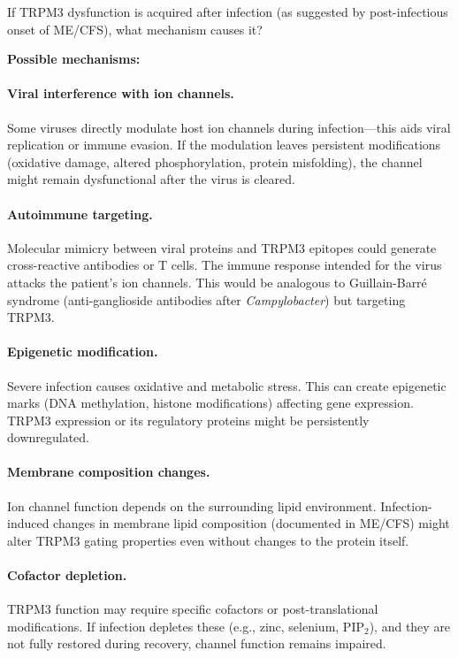 \begin{open_question}
If TRPM3 dysfunction is acquired after infection (as suggested by post-infectious onset of ME/CFS), what mechanism causes it?

\textbf{Possible mechanisms:}

\paragraph{Viral interference with ion channels.}
Some viruses directly modulate host ion channels during infection---this aids viral replication or immune evasion. If the modulation leaves persistent modifications (oxidative damage, altered phosphorylation, protein misfolding), the channel might remain dysfunctional after the virus is cleared.

\paragraph{Autoimmune targeting.}
Molecular mimicry between viral proteins and TRPM3 epitopes could generate cross-reactive antibodies or T cells. The immune response intended for the virus attacks the patient's ion channels. This would be analogous to Guillain-Barré syndrome (anti-ganglioside antibodies after \textit{Campylobacter}) but targeting TRPM3.

\paragraph{Epigenetic modification.}
Severe infection causes oxidative and metabolic stress. This can create epigenetic marks (DNA methylation, histone modifications) affecting gene expression. TRPM3 expression or its regulatory proteins might be persistently downregulated.

\paragraph{Membrane composition changes.}
Ion channel function depends on the surrounding lipid environment. Infection-induced changes in membrane lipid composition (documented in ME/CFS) might alter TRPM3 gating properties even without changes to the protein itself.

\paragraph{Cofactor depletion.}
TRPM3 function may require specific cofactors or post-translational modifications. If infection depletes these (e.g., zinc, selenium, PIP$_2$), and they are not fully restored during recovery, channel function remains impaired.
\end{open_question}

